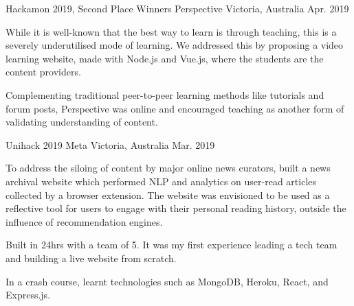 \begin{cventries}
\cventry
    {Hackamon 2019, Second Place Winners}
    {Perspective}
    {Victoria, Australia}
    {Apr. 2019}
    {
      \begin{cvitems}
        \item {While it is well-known that the best way to learn is through teaching, this is a severely underutilised mode of learning. We addressed this by proposing a video learning website, made with Node.js and Vue.js, where the students are the content providers.}
        \item {Complementing traditional peer-to-peer learning methods like tutorials and forum posts, Perspective was online and encouraged teaching as another form of validating understanding of content.}
      \end{cvitems}
    }
  \cventry
    {Unihack 2019}
    {Meta}
    {Victoria, Australia}
    {Mar. 2019}
    {
      \begin{cvitems}
        \item {To address the siloing of content by major online news curators, built a news archival website which performed NLP and analytics on user-read articles collected by a browser extension. The website was envisioned to be used as a reflective tool for users to engage with their personal reading history, outside the influence of recommendation engines.}
        \item {Built in 24hrs with a team of 5. It was my first experience leading a tech team and building a live website from scratch.}
        \item {In a crash course, learnt technologies such as MongoDB, Heroku, React, and Express.js.}
      \end{cvitems}
    }
\end{cventries}
